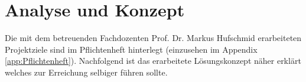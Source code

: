 \section{Analyse und Konzept}
\label{sec:Analyse_Kozept}

Die mit dem betreuenden Fachdozenten Prof. Dr. Markus Hufschmid erarbeiteten Projektziele sind im Pflichtenheft hinterlegt (einzusehen im Appendix \ref{app:Pflichtenheft}).  Nachfolgend ist das erarbeitete Lösungskonzept näher erklärt welches zur Erreichung selbiger führen sollte.
